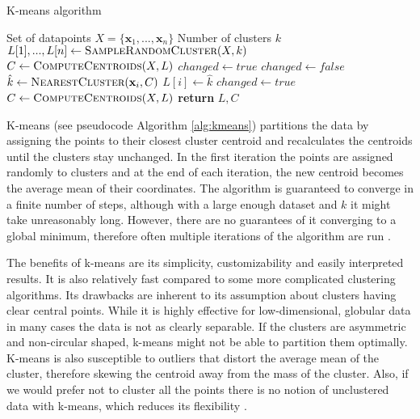 \begin{algorithm}
\caption{K-means algorithm \cite{ir-in-practise}}\label{alg:kmeans}
\begin{algorithmic}[1]
\Require Set of datapoints $X=\{\mathbf{x}_1, ..., \mathbf{x}_n\}$
\Require Number of clusters $k$
  \State $L[1], ..., L[n] \gets \Call{SampleRandomCluster}{X, k}$ 
  \State $C \gets \Call{ComputeCentroids}{X, L}$
  \State $changed \gets true$
    \State $changed \gets false$
      \State $\hat{k} \gets \Call{NearestCluster}{\mathbf{x}_i, C}$ 
        \State $L[i] \gets \hat{k}$
        \State $changed \gets true$
      \EndIf
    \EndFor
    \State $C \gets \Call{ComputeCentroids}{X, L}$ 
  \EndWhile\label{euclidendwhile}
  \State \textbf{return} $L, C$
\EndProcedure
\end{algorithmic}
\end{algorithm}

K-means (see pseudocode Algorithm \ref{alg:kmeans}) partitions the data by assigning the points to their closest cluster centroid and recalculates the centroids until the clusters stay unchanged. In the first iteration the points are assigned randomly to clusters and at the end of each iteration, the new centroid becomes the average mean of their coordinates. The algorithm is guaranteed to converge in a finite number of steps, although with a large enough dataset and $k$ it might take unreasonably long. However, there are no guarantees of it converging to a global minimum, therefore often multiple iterations of the algorithm are run \cite{jain-50y-kmeans-2010}.

The benefits of k-means are its simplicity, customizability and easily interpreted results. It is also relatively fast compared to some more complicated clustering algorithms. Its drawbacks are inherent to its assumption about clusters having clear central points. While it is highly effective for low-dimensional, globular data in many cases the data is not as clearly separable. If the clusters are asymmetric and non-circular shaped, k-means might not be able to partition them optimally. K-means is also susceptible to outliers that distort the average mean of the cluster, therefore skewing the centroid away from the mass of the cluster. Also, if we would prefer not to cluster all the points there is no notion of unclustered data with k-means, which reduces its flexibility \cite{jain-50y-kmeans-2010, ma-kmeans-dbscan-timeseries}.

